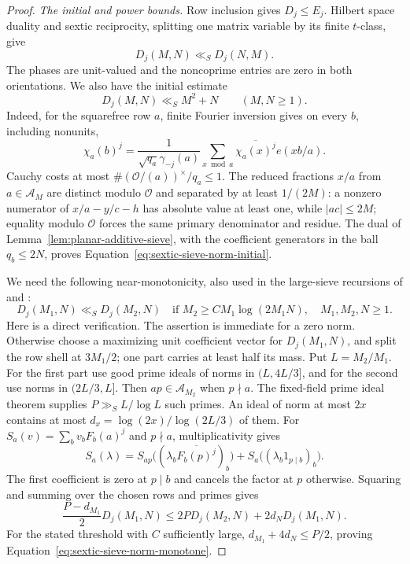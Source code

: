 \documentclass[11pt,a4paper]{article}
\numberwithin{equation}{section}
\numberwithin{figure}{section}
\theoremstyle{definition}
\theoremstyle{remark}
\begin{document}
\begin{proof}
\medskip\noindent\emph{The initial and power bounds.}
Row inclusion gives $D_j\le E_j$.  Hilbert space duality and sextic
reciprocity, splitting one matrix variable by its finite $t$-class, give
\begin{equation}\label{eq:sextic-sieve-norm-symmetry}
 D_j(M,N)\ll_S D_j(N,M).
\end{equation}
The phases are unit-valued and the noncoprime entries are zero in both
orientations.  We also have the initial estimate
\begin{equation}\label{eq:sextic-sieve-norm-initial}
 D_j(M,N)\ll_S M^2+N\qquad(M,N\ge1).
\end{equation}
Indeed, for the squarefree row $a$, finite Fourier inversion gives on
every $b$, including nonunits,
\[
 \chi_a(b)^j=\frac1{\sqrt{q_a}\gamma_{-j}(a)}
       \sum_{x\bmod a}\overline{\chi_a(x)^j}e(xb/a).
\]
Cauchy costs at most $\#(\mathcal O/(a))^\times/q_a\le1$.  The reduced
fractions $x/a$ from $a\in\mathcal A_M$ are distinct modulo $\mathcal O$
and separated by
at least $1/(2M)$: a nonzero numerator of $x/a-y/c-h$ has absolute value
at least one, while $|ac|\le2M$; equality modulo $\mathcal O$ forces the
same primary denominator and residue.  The dual of
Lemma~\ref{lem:planar-additive-sieve}, with the coefficient generators in
the ball $q_b\le2N$, proves Equation~\eqref{eq:sextic-sieve-norm-initial}.

We need the following near-monotonicity, also used in the large-sieve
recursions of \cite[Lemma~4.4 and Remark~5]{GL} and \cite[Lemma~3.1]{BGL}:
\begin{equation}\label{eq:sextic-sieve-norm-monotone}
 D_j(M_1,N)\ll_S D_j(M_2,N)
 \quad\text{if }M_2\ge C M_1\log(2M_1N),\quad M_1,M_2,N\ge1.
\end{equation}
Here is a direct verification.  The assertion is immediate for a zero norm.
Otherwise choose a maximizing unit coefficient vector for $D_j(M_1,N)$,
and split the row shell at $3M_1/2$; one part
carries at least half its mass.  Put $L=M_2/M_1$.  For the first part use
good prime ideals of norms in $(L,4L/3]$, and for the second use norms in
$(2L/3,L]$.  Then $ap\in\mathcal A_{M_2}$ when $p\nmid a$.  The fixed-field
prime ideal theorem supplies $P\gg_S L/\log L$ such primes.  An ideal of
norm at most $2x$ contains at most
$d_x=\log(2x)/\log(2L/3)$ of them.  For
$S_a(v)=\sum_bv_bF_b(a)^j$ and $p\nmid a$, multiplicativity gives
\[
 S_a(\lambda)=S_{ap}\bigl((\lambda_b\overline{F_b(p)^j})_b\bigr)
                  +S_a\bigl((\lambda_b1_{p\mid b})_b\bigr).
\]
The first coefficient is zero at $p\mid b$ and cancels the factor at $p$
otherwise.  Squaring and summing over the chosen rows and primes gives
\[
 \frac{P-d_{M_1}}2D_j(M_1,N)
 \le2P D_j(M_2,N)+2d_ND_j(M_1,N).
\]
For the stated threshold with $C$ sufficiently large,
$d_{M_1}+4d_N\le P/2$, proving
Equation~\eqref{eq:sextic-sieve-norm-monotone}.


\end{proof}
\end{document}
